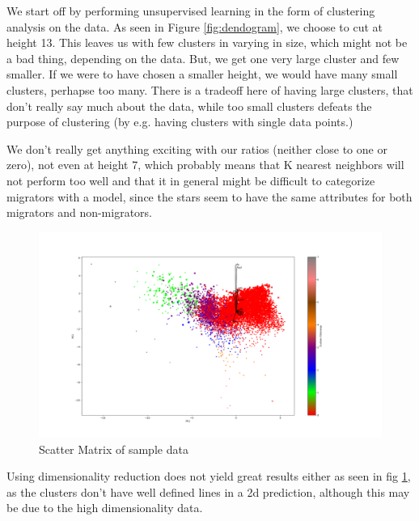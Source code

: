 We start off by performing unsupervised learning in the form of clustering analysis on the data. As seen in Figure \ref{fig:dendogram}, we choose to cut at height 13. This leaves us with few clusters in varying in size, which might not be a bad thing, depending on the data. But, we get one very large cluster and few smaller. If we were to have chosen a smaller height, we would have many small clusters, perhapse too many. There is a tradeoff here of having large clusters, that don't really say much about the data, while too small clusters defeats the purpose of clustering (by e.g. having clusters with single data points.)



We don't really get anything exciting with our ratios (neither close to one or zero), not even at height 7, which  probably means that K nearest neighbors will not perform too well and that it in general might be difficult to categorize migrators with a model, since the stars seem to have the same attributes for both migrators and non-migrators.

\begin{figure}[h!]
    \centering
    \includegraphics[width=\columnwidth]{Plots/Biplot_with_clustering.png}
    \caption{Scatter Matrix of sample data}
    \label{fig:biplot}
\end{figure}

Using dimensionality reduction does not yield great results either as seen in fig \ref{fig:biplot}, as the clusters don't have well defined lines in a 2d prediction, although this may be due to the high dimensionality data.